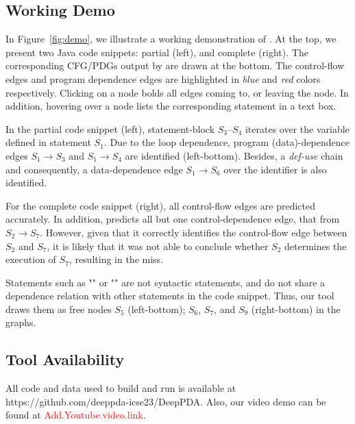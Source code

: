 \subsection{Working Demo}
In Figure~\ref{fig:demo}, we illustrate a working demonstration of \tool. At the top, we present two Java code snippets: partial (left), and complete (right). The corresponding CFG/PDGs output by \tool are drawn at the bottom. The control-flow edges and program dependence edges are highlighted in \textit{blue} and \textit{red} colors respectively. Clicking on a node bolds all edges coming to, or leaving the node. In addition, hovering over a node lists the corresponding statement in a text box.

In the partial code snippet (left), statement-block $S_3$--$S_4$ iterates over the variable  defined in statement $S_1$. Due to the loop dependence, program (data)-dependence edges $S_1{\rightarrow}S_3$ and $S_1{\rightarrow}S_4$ are identified (left-bottom). Besides, a \textit{def-use} chain and consequently, a data-dependence edge $S_1{\rightarrow}S_6$  over the identifier  is also identified.

For the complete code snippet (right), all control-flow edges are predicted accurately. In addition, \tool predicts all but one control-dependence edge, that from $S_2{\rightarrow}S_7$. However, given that it correctly identifies the control-flow edge between $S_2$ and $S_7$, it is likely that it was not able to conclude whether $S_2$ determines the execution of $S_7$, resulting in the miss.

Statements such as "\code{\{}" or "\code{\}}" are not syntactic statements, and do not share a dependence relation with other statements in the code snippet. Thus, our tool draws them as free nodes $S_5$ (left-bottom); $S_6$, $S_7$, and $S_9$ (right-bottom) in the graphs.

\subsection{Tool Availability}
All code and data used to build and run \tool is available at {https://github.com/deeppda-icse23/DeepPDA}. Also, our video demo can be found at \textcolor{red}{{Add.Youtube.video.link}}.